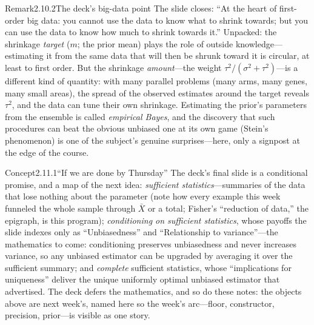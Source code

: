 \documentclass[main.tex]{subfiles}
\begin{document}
\begin{ObjL}{Remark}{2.10.2}{The deck's big-data point}
The slide closes: ``At the heart of first-order big data: you cannot use the data to know
what to shrink towards; but you can use the data to know how much to shrink towards it.''
Unpacked: the shrinkage \emph{target} ($m$; the prior mean) plays the role of outside
knowledge---estimating it from the same data that will then be shrunk toward it is
circular, at least to first order. But the shrinkage \emph{amount}---the weight
$\tau^2/(\sigma^2+\tau^2)$---is a different kind of quantity: with many parallel problems
(many arms, many genes, many small areas), the spread of the observed estimates around the
target reveals $\tau^2$, and the data can tune their own shrinkage. Estimating the prior's
parameters from the ensemble is called \emph{empirical Bayes}, and the discovery that such
procedures can beat the obvious unbiased one at its own game (Stein's phenomenon) is one of
the subject's genuine surprises---here, only a signpost at the edge of the course.
\end{ObjL}


\begin{ObjL}{Concept}{2.11.1}{``If we are done by Thursday''}
The deck's final slide is a conditional promise, and a map of the next idea: \emph{sufficient
statistics}---summaries of the data that lose nothing about the parameter (note how every
example this week funneled the whole sample through $\bar X$ or a total; Fisher's ``reduction
of data,'' the epigraph, is this program); \emph{conditioning on sufficient statistics},
whose payoffs the slide indexes only as ``Unbiasedness'' and ``Relationship to
variance''---the mathematics to come: conditioning preserves unbiasedness and never
increases variance, so any unbiased estimator can be upgraded by averaging it over the
sufficient summary; and \emph{complete} sufficient statistics, whose ``implications for uniqueness''
deliver the unique uniformly optimal unbiased estimator that  advertised. The
deck defers the mathematics, and so do these notes: the objects above are next week's, named
here so the week's arc---floor, constructor, precision, prior---is visible as one story.
\end{ObjL}

\lectureappendix
\end{document}
